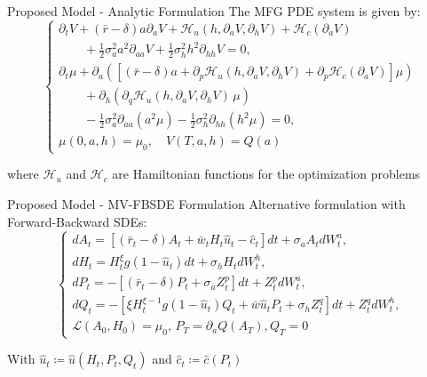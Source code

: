 \documentclass{beamer}
\newcommand{\HH}{\mathcal{H}}
\begin{document}
\begin{frame}{Proposed Model - Analytic Formulation}
The MFG PDE system is given by:
\begin{equation}
    \begin{cases}
        \partial_t V + (\bar r  - \delta) a \partial_a V + \HH_u(h, \partial_a V, \partial_h V)  + \HH_c(\partial_a V) \\
        \quad\quad + \frac{1}{2} \sigma_a^2 a^2 \partial_{aa} V + \frac{1}{2} \sigma^2_h h^2 \partial_{hh} V = 0,\\[10pt]
        \partial_t \mu + \partial_a \left( \left[ (\bar r - \delta) a + \partial_p \HH_u(h, \partial_a V, \partial_h V) + \partial_p \HH_c(\partial_a V) \right] \mu \right) \\
        \quad\quad + \partial_h \left( \partial_q \HH_u(h, \partial_a V, \partial_h V)\, \mu\right) \\
        \quad\quad - \frac{1}{2} \sigma_a^2 \partial_{aa} (a^2\mu) - \frac{1}{2} \sigma^2_h \partial_{hh} (h^2\mu) = 0,\\[10pt]
        \mu(0,a,h) = \mu_0,\quad V(T,a,h) = Q(a)
    \end{cases}
\end{equation}

where $\HH_u$ and $\HH_c$ are Hamiltonian functions for the optimization problems
\end{frame}

\begin{frame}{Proposed Model - MV-FBSDE Formulation}
Alternative formulation with Forward-Backward SDEs:
\begin{equation}
    \begin{cases}
        d A_t = \left[ (\bar r_t - \delta) A_t + \bar w_t H_t {\hat u}_t - {\hat c}_t  \right] dt + \sigma_a A_t d W^a_t,\\
        d H_t = H^\xi_t g(1 - {\hat u}_t) dt + \sigma_h H_t d W^h_t,\\
        d P_t = -\left[ (\bar r_t - \delta) P_t + \sigma_a Z^p_t \right]dt + Z^p_t d W^a_t,\\
        d Q_t = - \left[ \xi H_t^{\xi - 1} g(1 - {\hat u}_t ) Q_t + {\bar w} {\hat u}_t P_t + \sigma_h Z^q_t \right] dt + Z^q_t d W^h_t,\\
        \mathcal{L}(A_0, H_0) = \mu_0, \, P_T = \partial_a Q(A_T), Q_T = 0
    \end{cases}
\end{equation}

With $\hat u_t \coloneqq \hat u(H_t,P_t,Q_t)$ and $\hat c_t \coloneqq \hat c(P_t)$
\end{frame}
\end{document}
